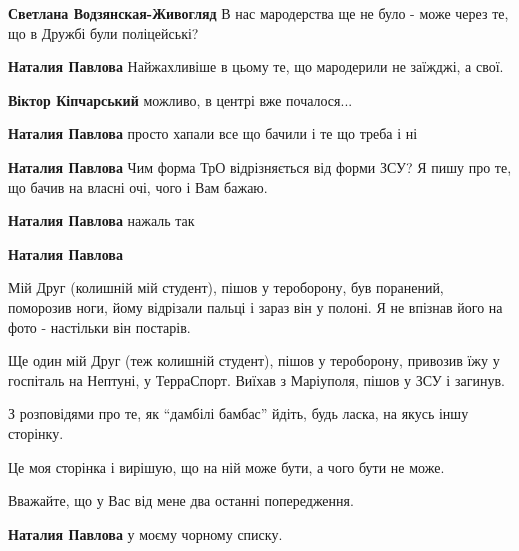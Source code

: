 \begin{itemize} %
\textbf{Светлана Водзянская-Живогляд} В нас мародерства ще не було - може через те, що в Дружбі були поліцейські?

\textbf{Наталия Павлова} Найжахливіше в цьому те, що мародерили не заїжджі, а свої.

\textbf{Віктор Кіпчарський} можливо, в центрі вже почалося...

\textbf{Наталия Павлова} просто хапали все що бачили і те що треба і ні

\textbf{Наталия Павлова} Чим форма ТрО відрізняється від форми ЗСУ?
Я пишу про те, що бачив на власні очі, чого і Вам бажаю.

\textbf{Наталия Павлова} нажаль так

\textbf{Наталия Павлова} 

Мій Друг (колишній мій студент), пішов у тероборону, був поранений, поморозив
ноги, йому відрізали пальці і зараз він у полоні. Я не впізнав його на фото -
настільки він постарів.

Ще один мій Друг (теж колишній студент), пішов у тероборону, привозив їжу у
госпіталь на Нептуні, у ТерраСпорт. Виїхав з Маріуполя, пішов у ЗСУ і загинув.

З розповідями про те, як \enquote{дамбілі бамбас} йдіть, будь ласка, на якусь іншу сторінку.

Це моя сторінка і вирішую, що на ній може бути, а чого бути не може.

Вважайте, що у Вас від мене два останні попередження.

\textbf{Наталия Павлова} у моєму чорному списку.

\end{itemize} %
